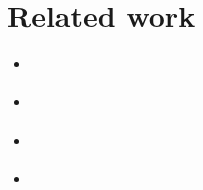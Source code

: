 \section{Related work}

\begin{itemize}
   \item \citet{field98}
   \item \citet{pombrio14}
   \item \citet{yang22}
   \item \citet{perera22}
\end{itemize}
